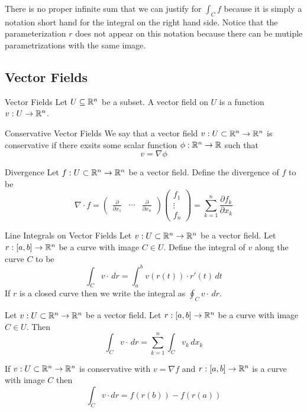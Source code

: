 \documentclass[a4paper]{article}
\begin{document}
There is no proper infinite sum that we can justify for $\int_Cf$ because it is simply a notation short hand for the integral on the right hand side. Notice that the parameterization $r$ does not appear on this notation because there can be mutiple parametrizations with the same image. 

\subsection{Vector Fields}
\begin{defn}{Vector Fields}{} Let $U\subseteq\mathbb{R}^n$ be a subset. A vector field on $U$ is a function $v:U\to\mathbb{R}^n$. 
\end{defn}

\begin{defn}{Conservative Vector Fields}{} We say that a vector field $v:U\subset\mathbb{R}^n\to\mathbb{R}^n$ is conservative if there exsits some scalar function $\phi:\mathbb{R}^n\to\mathbb{R}$ such that $$v=\nabla\phi$$
\end{defn}

\begin{defn}{Divergence}{} Let $f:U\subset\mathbb{R}^n\to\mathbb{R}^n$ be a vector field. Define the divergence of $f$ to be $$\nabla\cdot f=\begin{pmatrix}\frac{\partial}{\partial x_1} & \cdots & \frac{\partial}{\partial x_n}\end{pmatrix}\begin{pmatrix}f_1\\\vdots\\f_n\end{pmatrix}=\sum_{k=1}^n\frac{\partial f_k}{\partial x_k}$$
\end{defn}

\begin{defn}{Line Integrals on Vector Fields}{} Let $v:U\subset\mathbb{R}^n\to\mathbb{R}^n$ be a vector field. Let $r:[a,b]\to\mathbb{R}^n$ be a curve with image $C\in U$. Define the integral of $v$ along the curve $C$ to be $$\int_Cv\cdot\,dr=\int_a^bv(r(t))\cdot r'(t)\,dt$$ If $r$ is a closed curve then we write the integral as $\oint_Cv\cdot\,dr$. 
\end{defn}

\begin{prp}{}{} Let $v:U\subset\mathbb{R}^n\to\mathbb{R}^n$ be a vector field. Let $r:[a,b]\to\mathbb{R}^n$ be a curve with image $C\in U$. Then $$\int_Cv\cdot\,dr=\sum_{k=1}^n\int_Cv_k\,dx_k$$
\end{prp}

\begin{prp}{}{} If $v:U\subset\mathbb{R}^n\to\mathbb{R}^n$ is conservative with $v=\nabla f$ and $r:[a,b]\to\mathbb{R}^n$ is a curve with image $C$ then $$\int_Cv\cdot dr=f(r(b))-f(r(a))$$
\end{prp}
\end{document}
